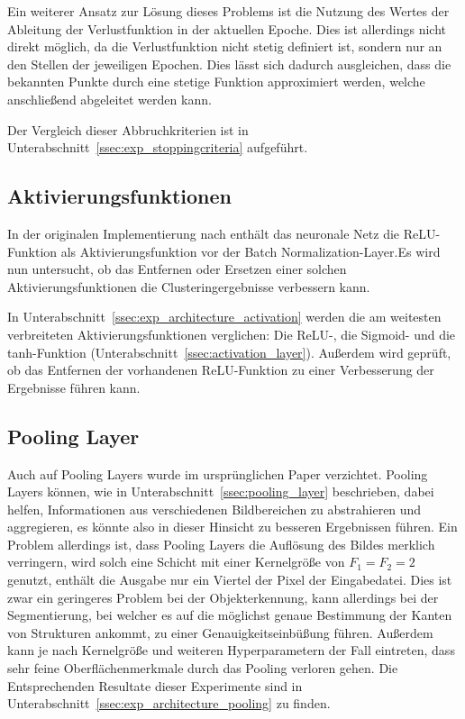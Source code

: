 Ein weiterer Ansatz zur Lösung dieses Problems ist die Nutzung des Wertes der Ableitung der Verlustfunktion in der aktuellen Epoche. Dies ist allerdings nicht direkt möglich, da die Verlustfunktion nicht stetig definiert ist, sondern nur an den Stellen der jeweiligen Epochen. Dies lässt sich dadurch ausgleichen, dass die bekannten Punkte durch eine stetige Funktion approximiert werden, welche anschließend abgeleitet werden kann.

Der Vergleich dieser Abbruchkriterien ist in Unterabschnitt~\ref{ssec:exp_stoppingcriteria} aufgeführt.

\subsection{Aktivierungsfunktionen}
\label{ssec:network_architecture_activation}

In der originalen Implementierung nach \cite{kanezaki_18} enthält das neuronale Netz die ReLU-Funktion als Aktivierungsfunktion vor der Batch Normalization-Layer.Es wird nun untersucht, ob das Entfernen oder Ersetzen einer solchen Aktivierungsfunktionen die Clusteringergebnisse verbessern kann.

In Unterabschnitt~\ref{ssec:exp_architecture_activation} werden die am weitesten verbreiteten Aktivierungsfunktionen verglichen: Die ReLU-, die Sigmoid- und die tanh-Funktion (\vgl Unterabschnitt~\ref{ssec:activation_layer}). Außerdem wird geprüft, ob das Entfernen der vorhandenen ReLU-Funktion zu einer Verbesserung der Ergebnisse führen kann.

\subsection{Pooling Layer}
\label{ssec:network_architecture_pooling}

Auch auf Pooling Layers wurde im ursprünglichen Paper verzichtet. Pooling Layers können, wie in Unterabschnitt~\ref{ssec:pooling_layer} beschrieben, dabei helfen, Informationen aus verschiedenen Bildbereichen zu abstrahieren und aggregieren, es könnte also in dieser Hinsicht zu besseren Ergebnissen führen. Ein Problem allerdings ist, dass Pooling Layers die Auflösung des Bildes merklich verringern, wird solch eine Schicht \bspw mit einer Kernelgröße von $F_1=F_2=2$ genutzt, enthält die Ausgabe nur ein Viertel der Pixel der Eingabedatei. Dies ist zwar ein geringeres Problem bei der Objekterkennung, kann allerdings bei der Segmentierung, bei welcher es auf die möglichst genaue Bestimmung der Kanten von Strukturen ankommt, zu einer Genauigkeitseinbüßung führen. Außerdem kann je nach Kernelgröße und weiteren Hyperparametern der Fall eintreten, dass sehr feine Oberflächenmerkmale durch das Pooling verloren gehen. Die Entsprechenden Resultate dieser Experimente sind in Unterabschnitt~\ref{ssec:exp_architecture_pooling} zu finden.

